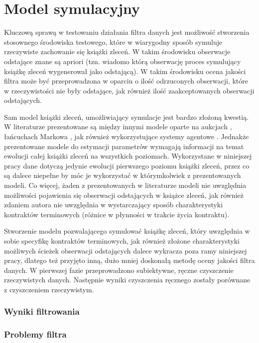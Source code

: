 \documentclass[a4paper,12pt,openany, DIV=calc, headsepline]{scrbook}
\begin{document}
\chapter{Model symulacyjny}

Kluczową sprawą w testowaniu działania filtra danych jest możliwość stworzenia stosownego środowiska testowego, które w wiarygodny sposób symuluje rzeczywiste zachowanie się książki zleceń. W takim środowisku obserwacje odstające znane są apriori (tzn. wiadomo którą obserwację proces symulujący książkę zleceń wygenerował jako odstającą). W takim środowisku ocena jakości filtra może być przeprowadzona w oparciu o ilość odrzuconych obserwacji, które w rzeczywistości nie były odstające, jak również ilość zaakceptowanych obserwacji odstających.

Sam model książki zleceń, umożliwiający symulacje jest bardzo złożoną kwestią. W literaturze prezentowane są między innymi modele oparte na aukcjach \citep{doubleAuction}, łańcuchach Markowa \citep{huang2015simulating}, jak również wykorzystujące systemy agentowe \citep{chiarella2009impact}. Jednakże prezentowane modele do estymacji parametrów wymagają informacji na temat ewolucji całej książki zleceń na wszystkich poziomach. Wykorzystane w niniejszej pracy dane dotyczą jedynie ewolucji pierwszego poziomu książki zleceń, przez co są dalece niepełne by móc je wykorzystać w którymkolwiek z prezentowanych modeli. Co więcej, żaden z prezentowanych w literaturze modeli nie uwzględnia możliwości pojawienia się obserwacji odstających w książce zleceń, jak również zdaniem autora nie uwzględnia w wystarczający sposób charakterystyki kontraktów terminowych (różnice w płynności w trakcie życia kontraktu). 

Stworzenie modelu pozwalającego symulować książkę zleceń, który uwzględnia w sobie specyfikę kontraktów terminowych, jak również złożone charakterystyki możliwych ścieżek obserwacji odstających dalece wykracza poza ramy niniejszej pracy, dlatego też przyjęto inną, dużo mniej doskonałą metodę oceny jakości filtra danych. W pierwszej fazie przeprowadzono subiektywne, ręczne czyszczenie rzeczywistych danych. Następnie wyniki czyszczenia ręcznego zostały porównane z czyszczeniem rzeczywistym.

\subsection{Wyniki filtrowania}

\subsection{Problemy filtra} 



\listoftables
{}
\listoffigures
{}
\printindex
\end{document}
